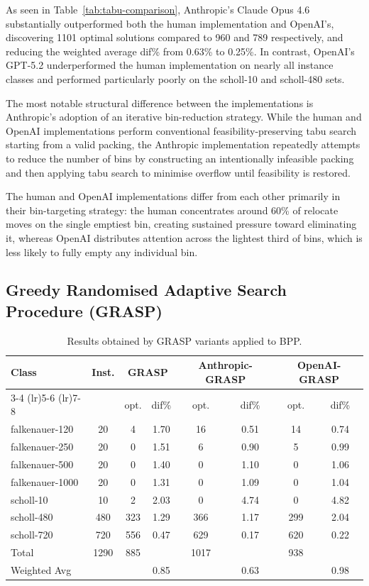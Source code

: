 \documentclass[11pt]{article}
\begin{document}
As seen in Table~\ref{tab:tabu-comparison}, Anthropic's Claude Opus 4.6 substantially outperformed both the human implementation 
and OpenAI's, discovering 1101 optimal solutions compared to 960 and 789 respectively, 
and reducing the weighted average dif\% from 0.63\% to 0.25\%. In contrast, OpenAI's 
GPT-5.2 underperformed the human implementation on nearly all instance classes and 
performed particularly poorly on the scholl-10 and scholl-480 sets.

The most notable structural difference between the implementations is Anthropic's 
adoption of an iterative bin-reduction strategy. While the human and OpenAI 
implementations perform conventional feasibility-preserving tabu search starting from 
a valid packing, the Anthropic implementation repeatedly attempts to reduce the number 
of bins by constructing an intentionally infeasible packing and then applying tabu 
search to minimise overflow until feasibility is restored.

The human and OpenAI implementations differ from each other primarily in their 
bin-targeting strategy: the human concentrates around 60\% of relocate moves on the 
single emptiest bin, creating sustained pressure toward eliminating it, whereas OpenAI 
distributes attention across the lightest third of bins, which is less likely to fully 
empty any individual bin.

\subsection{Greedy Randomised Adaptive Search Procedure (GRASP)}
\begin{table}[H]
\centering
\caption{Results obtained by GRASP variants applied to BPP.}
\label{tab:grasp-comparison}
\begin{tabular}{l c cc cc cc}
\toprule
\multirow{2}{*}{Class} & \multirow{2}{*}{Inst.} & \multicolumn{2}{c}{GRASP} & \multicolumn{2}{c}{Anthropic-GRASP} & \multicolumn{2}{c}{OpenAI-GRASP} \\
\cmidrule(lr){3-4} \cmidrule(lr){5-6} \cmidrule(lr){7-8}
 & & opt. & dif\% & opt. & dif\% & opt. & dif\% \\
\midrule
falkenauer-120  & 20   & 4    & 1.70 & 16   & 0.51 & 14   & 0.74 \\
falkenauer-250  & 20   & 0    & 1.51 & 6    & 0.90 & 5    & 0.99 \\
falkenauer-500  & 20   & 0    & 1.40 & 0    & 1.10 & 0    & 1.06 \\
falkenauer-1000 & 20   & 0    & 1.31 & 0    & 1.09 & 0    & 1.04 \\
scholl-10       & 10   & 2    & 2.03 & 0    & 4.74 & 0    & 4.82 \\
scholl-480      & 480  & 323  & 1.29 & 366  & 1.17 & 299  & 2.04 \\
scholl-720      & 720  & 556  & 0.47 & 629  & 0.17 & 620  & 0.22 \\
\midrule
Total           & 1290 & 885  &      & 1017 &      & 938  &      \\
Weighted Avg    &      &      & 0.85 &      & 0.63 &      & 0.98 \\
\bottomrule
\end{tabular}
\end{table}
\end{document}
